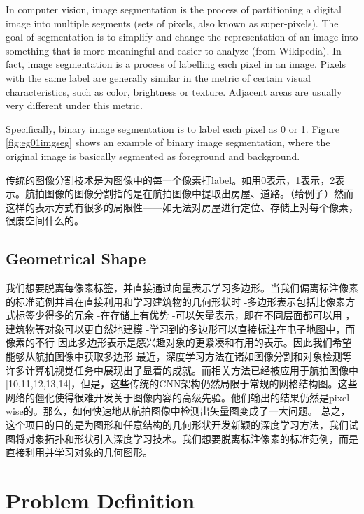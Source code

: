 In computer vision, image segmentation is the process of partitioning a digital image into multiple segments (sets of pixels, also known as super-pixels). The goal of segmentation is to simplify and change the representation of an image into something that is more meaningful and easier to analyze (from Wikipedia). In fact, image segmentation is a process of labelling each pixel in an image. Pixels with the same label are generally similar in the metric of certain visual characteristics, such as color, brightness or texture. Adjacent areas are usually very different under this metric.

Specifically, binary image segmentation is to label each pixel as 0 or 1. Figure \ref{fig:eg01imgseg} shows an example of binary image segmentation, where the original image is basically segmented as foreground and background.

传统的图像分割技术是为图像中的每一个像素打label。如用0表示，1表示，2表示。航拍图像的图像分割指的是在航拍图像中提取出房屋、道路。（给例子）然而这样的表示方式有很多的局限性——如无法对房屋进行定位、存储上对每个像素，很废空间什么的。



\subsection{Geometrical Shape}\label{geosha}

我们想要脱离每像素标签，并直接通过向量表示学习多边形。当我们偏离标注像素的标准范例并旨在直接利用和学习建筑物的几何形状时
-多边形表示包括比像素方式标签少得多的冗余
-在存储上有优势
-可以矢量表示，即在不同层面都可以用	，建筑物等对象可以更自然地建模
-学习到的多边形可以直接标注在电子地图中，而像素的不行
因此多边形表示是感兴趣对象的更紧凑和有用的表示。因此我们希望能够从航拍图像中获取多边形
最近，深度学习方法在诸如图像分割和对象检测等许多计算机视觉任务中展现出了显着的成就。而相关方法已经被应用于航拍图像中[10,11,12,13,14]，但是，这些传统的CNN架构仍然局限于常规的网格结构图。这些网络的僵化使得很难开发关于图像内容的高级先验。他们输出的结果仍然是pixel wise的。那么，如何快速地从航拍图像中检测出矢量图变成了一大问题。
总之，这个项目的目的是为图形和任意结构的几何形状开发新颖的深度学习方法，我们试图将对象拓扑和形状引入深度学习技术。我们想要脱离标注像素的标准范例，而是直接利用并学习对象的几何图形。

\section{Problem Definition}\label{prodef}


